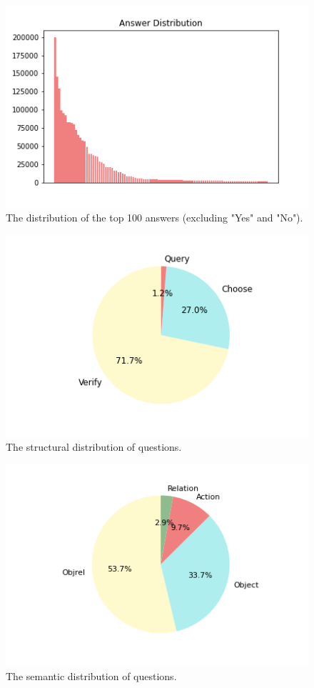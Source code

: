 \documentclass[10pt,twocolumn,letterpaper]{article}
\begin{document}

\begin{figure}[t]
\begin{center}
\includegraphics[width=0.8\linewidth]{Figures/answer_dist.png}
\end{center}
   \caption{The distribution of the top 100 answers (excluding "Yes" and "No").}
\label{answer_dist}
\end{figure}


\begin{figure}[t]
\begin{center}
\includegraphics[width=0.8\linewidth]{Figures/struct_dist.png}
\caption{The structural distribution of questions.}
\end{center}
\label{structural}
\end{figure}


\begin{figure}[t]
\begin{center}
\includegraphics[width=0.8\linewidth]{Figures/sem_dist.png}
\end{center}
   \caption{The semantic distribution of questions.}
\label{semantics}
\end{figure}
\end{document}
